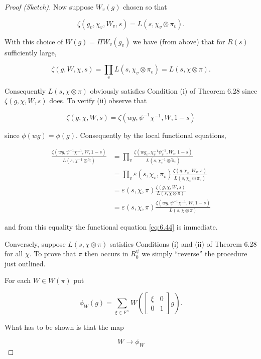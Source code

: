 \begin{proof}[Proof (Sketch)]
Now suppose $W_v(g)$ chosen so that

\[
\zeta(g_v, \chi_v, W_v, s) = L(s, \chi_v \otimes \pi_v).
\]

With this choice of $W(g) = \Pi W_v(g_v)$ we have (from above) that for $R(s)$ sufficiently large,

\[
\zeta(g, W, \chi, s) = \prod_v L(s, \chi_v \otimes \pi_v) = L(s, \chi \otimes \pi).
\]

Consequently $L(s, \chi \otimes \pi)$ obviously satisfies Condition (i) of Theorem 6.28 since $\zeta(g, \chi, W, s)$ does. To verify (ii) observe that

\[
\zeta(g, \chi, W, s) = \zeta(wg, \psi^{-1}\chi^{-1}, W, 1 - s)
\]

since $\phi(wg) = \phi(g)$. Consequently by the local functional equations,

\[
\begin{aligned}
\frac{\zeta(wg, \psi^{-1}\chi^{-1}, W, 1 - s)}{L(s, \chi^{-1} \otimes \tilde{\pi})} &= \prod_v \frac{\zeta(wg_v, \chi_v^{-1}\psi_v^{-1}, W_v, 1 - s)}{L(s, \chi_v^{-1} \otimes \tilde{\pi}_v)}\\
&= \prod_v \varepsilon(s, \chi_v, \pi_v) \frac{\zeta(g, \chi_v, W_v, s)}{L(s, \chi_v \otimes \pi_v)}\\
&= \varepsilon(s, \chi, \pi) \frac{\zeta(g, \chi, W, s)}{L(s, \chi \otimes \pi)}\\
&= \varepsilon(s, \chi, \pi) \frac{\zeta(wg, \psi^{-1}\chi^{-1}, W, 1 - s)}{L(s, \chi \otimes \pi)}
\end{aligned}
\]

and from this equality the functional equation \eqref{eq:6.44} is immediate.

Conversely, suppose $L(s, \chi \otimes \pi)$ satisfies Conditions (i) and (ii) of Theorem 6.28 for all $\chi$. To prove that $\pi$ then occurs in $R_0^{\psi}$ we simply ``reverse'' the procedure just outlined.

For each $W \in W(\pi)$ put

\begin{equation}\label{eq:6.47}
\phi_W(g) = \sum_{\xi \in F^{\times}} W\!\left(\begin{bmatrix} \xi & 0 \\ 0 & 1 \end{bmatrix} g\right).\tag{6.47}
\end{equation}

What has to be shown is that the map

\[
W \to \phi_W
\]


\end{proof}
